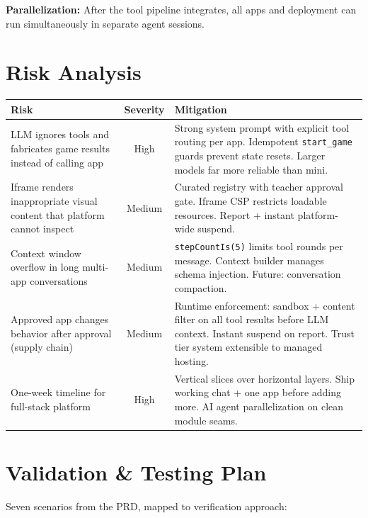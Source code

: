 \documentclass[11pt,letterpaper]{article}
\begin{document}
\noindent\textbf{Parallelization:} After the tool pipeline integrates, all apps and deployment can run simultaneously in separate agent sessions.

\section*{Risk Analysis}

\begin{tabularx}{\textwidth}{X c X}
\toprule
\textbf{Risk} & \textbf{Severity} & \textbf{Mitigation} \\
\midrule
LLM ignores tools and fabricates game results instead of calling app & High & Strong system prompt with explicit tool routing per app. Idempotent \texttt{start\_game} guards prevent state resets. Larger models far more reliable than mini. \\
\addlinespace
Iframe renders inappropriate visual content that platform cannot inspect & Medium & Curated registry with teacher approval gate. Iframe CSP restricts loadable resources. Report + instant platform-wide suspend. \\
\addlinespace
Context window overflow in long multi-app conversations & Medium & \texttt{stepCountIs(5)} limits tool rounds per message. Context builder manages schema injection. Future: conversation compaction. \\
\addlinespace
Approved app changes behavior after approval (supply chain) & Medium & Runtime enforcement: sandbox + content filter on all tool results before LLM context. Instant suspend on report. Trust tier system extensible to managed hosting. \\
\addlinespace
One-week timeline for full-stack platform & High & Vertical slices over horizontal layers. Ship working chat + one app before adding more. AI agent parallelization on clean module seams. \\
\bottomrule
\end{tabularx}

\section*{Validation \& Testing Plan}

Seven scenarios from the PRD, mapped to verification approach:
\end{document}
